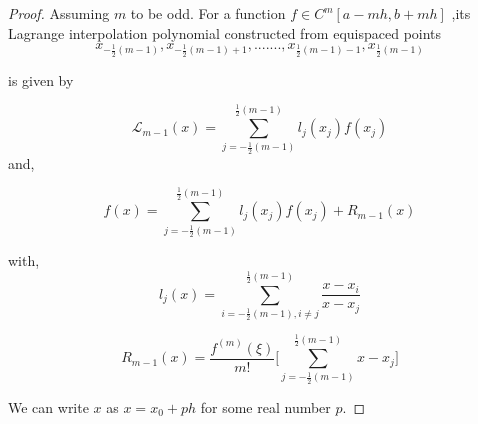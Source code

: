 \documentclass{article}
\begin{document}
\begin{proof}
Assuming $m$ to be odd.
For a function $f \in C^{m}[a-mh,b+mh]$ ,its Lagrange interpolation polynomial constructed from  equispaced points 
$$
x_{-\frac{1}{2}(m-1)} , x_{-\frac{1}{2}(m-1)+1} , .......
, x_{\frac{1}{2}(m-1)-1} , x_{\frac{1}{2}(m-1)}
$$




is given by


\begin{equation} 
    \mathcal{L}_{m-1}(x) = 
    \sum_{ j=-\frac{1}{2}(m-1) }^{ \frac{1}{2}(m-1) } 
    l_j(x_j) f(x_j)
\end{equation}
and,

\begin{equation} \label{main_eqn}
f(x) =  
\sum_{ j=-\frac{1}{2}(m-1) }^{ \frac{1}{2}(m-1) } 
l_j(x_j) f(x_j) + R_{m-1}(x)
\end{equation}


with,
\begin{equation*} 
    l_j(x) = 
    \sum_{i = -\frac{1}{2}(m-1) , i \neq j}^{\frac{1}{2}(m-1)} 
    \frac{x - x_i}{x - x_j}
\end{equation*}
    
\begin{equation*} 
    R_{m-1}(x) =  \frac{ f^{(m)}(\xi) }{ m! }
    \bigg[  
    \sum_{j = -\frac{1}{2}(m-1) }^{ \frac{1}{2}(m-1) } 
    x-x_j
    \bigg]
\end{equation*}



We can write $x$ as $x = x_0 + ph $ for some real number $p$.


\end{proof}
\end{document}

